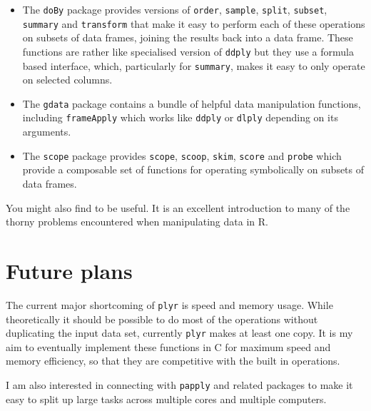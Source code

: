 \documentclass{scrartcl}
\newcommand{\code}[1]{\lstinline!#1!}
\newcommand{\plyr}{{\tt plyr}\xspace}
\begin{document}
\begin{itemize}
  \item The {\tt doBy} \citep{doby} package provides versions of \code{order}, \code{sample}, \code{split}, \code{subset}, \code{summary} and \code{transform} that make it easy to perform each of these operations on subsets of data frames, joining the results back into a data frame.  These functions are rather like specialised version of \code{ddply} but they use a formula based interface, which, particularly for \code{summary}, makes it easy to only operate on selected columns. 
  
  \item The {\tt gdata} \citep{gdata} package contains a bundle of helpful data manipulation functions, including \code{frameApply} which works like \code{ddply} or \code{dlply} depending on its arguments.

  \item The {\tt scope} \citep{scope} package provides \code{scope}, \code{scoop}, \code{skim}, \code{score} and \code{probe} which provide a composable set of functions for operating symbolically on subsets of data frames.
  
\end{itemize}

You might also find \citet{spector:2008} to be useful.  It is an excellent introduction to many of the thorny problems encountered when manipulating data in R.

\section{Future plans}
\label{sec:future}

The current major shortcoming of \plyr is speed and memory usage.  While theoretically it should be possible to do most of the operations without duplicating the input data set, currently \plyr makes at least one copy.  It is my aim to eventually implement these functions in C for maximum speed and memory efficiency, so that they are competitive with the built in operations.  

I am also interested in connecting with {\tt papply} \citep{papply} and related packages to make it easy to split up large tasks across multiple cores and multiple computers.


\end{document}
